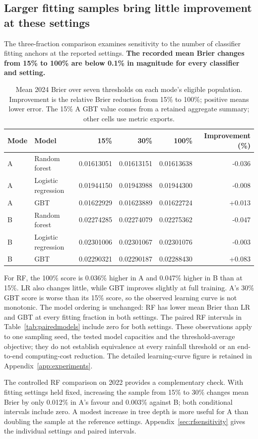 \subsection{Larger fitting samples bring little improvement at these settings}
The three-fraction comparison examines sensitivity to the number of classifier fitting anchors at the reported settings. \textbf{The recorded mean Brier changes from 15\% to 100\% are below 0.1\% in magnitude for every classifier and setting.}
\begin{table}[!ht]\centering\small
\begin{tabular}{llrrrr}\toprule
Mode & Model & 15\% & 30\% & 100\% & Improvement (\%)\\\midrule
A & Random forest & 0.01613051 & 0.01613151 & 0.01613638 & -0.036 \\
A & Logistic regression & 0.01944150 & 0.01943988 & 0.01944300 & -0.008 \\
A & GBT & 0.01622929 & 0.01623889 & 0.01622724 & +0.013 \\
B & Random forest & 0.02274285 & 0.02274079 & 0.02275362 & -0.047 \\
B & Logistic regression & 0.02301006 & 0.02301067 & 0.02301076 & -0.003 \\
B & GBT & 0.02290321 & 0.02290187 & 0.02288430 & +0.083 \\
\bottomrule\end{tabular}
\caption{Mean 2024 Brier over seven thresholds on each mode's eligible population. Improvement is the relative Brier reduction from 15\% to 100\%; positive means lower error. The 15\% A GBT value comes from a retained aggregate summary; other cells use metric exports.}\label{tab:trainingsampling}
\end{table}
For RF, the 100\% score is 0.036\% higher in A and 0.047\% higher in B than at 15\%. LR also changes little, while GBT improves slightly at full training. A's 30\% GBT score is worse than its 15\% score, so the observed learning curve is not monotonic. The model ordering is unchanged: RF has lower mean Brier than LR and GBT at every fitting fraction in both settings. The paired RF intervals in Table~\ref{tab:pairedmodels} include zero for both settings. These observations apply to one sampling seed, the tested model capacities and the threshold-average objective; they do not establish equivalence at every rainfall threshold or an end-to-end computing-cost reduction. The detailed learning-curve figure is retained in Appendix~\ref{app:experiments}.

The controlled RF comparison on 2022 provides a complementary check. With fitting settings held fixed, increasing the sample from 15\% to 30\% changes mean Brier by only 0.012\% in A's favour and 0.003\% against B; both conditional intervals include zero. A modest increase in tree depth is more useful for A than doubling the sample at the reference settings. Appendix~\ref{sec:rfsensitivity} gives the individual settings and paired intervals.

